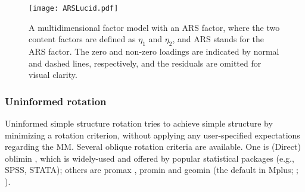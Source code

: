 \documentclass[a4paper,man,natbib]{apa6}
\begin{document}
\begin{linenumbers}
\begin{figure}[h]
	\centering
	\texttt{[image: ARSLucid.pdf]}
	\caption {A multidimensional factor model with an ARS factor, where the two content factors are defined as $\eta_{1}$ and $\eta_{2}$, and ARS stands for the ARS factor. The zero and non-zero loadings are indicated by normal and dashed lines, respectively, and the residuals are omitted for visual clarity. }
	\label{fig:ARSPlotDotted}
\end{figure}





\subsubsection{Uninformed rotation}
Uninformed simple structure rotation tries to achieve simple structure by minimizing a rotation criterion, without applying any user-specified expectations regarding the MM. Several oblique rotation criteria are available. One is (Direct) oblimin \citep{clarkson1988quartic}, which is widely-used and offered by popular statistical packages (e.g., SPSS, STATA); others are promax \citep{hendrickson1964promax}, promin \citep{lorenzo1999promin} and geomin (the default in Mplus; \citealp{asparouhov2009exploratory}; \citealp{yates1988multivariate}).


\end{linenumbers}
\end{document}
